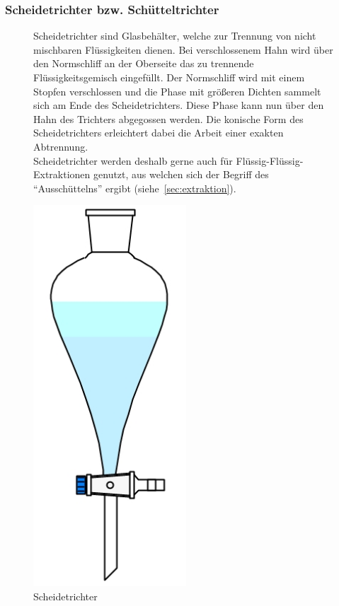  \newpage
 
\subsubsection*{Scheidetrichter bzw. Schütteltrichter}
\begin{figure}[h!]
	\begin{minipage}[t]{0.68\textwidth}
		\vspace{0pt}
		Scheidetrichter sind Glasbehälter, welche zur Trennung von nicht mischbaren Flüssigkeiten dienen. Bei verschlossenem Hahn wird über den Normschliff an der Oberseite das zu trennende Flüssigkeitsgemisch eingefüllt. Der Normschliff wird mit einem Stopfen verschlossen und die Phase mit größeren Dichten sammelt sich am Ende des Scheidetrichters. Diese Phase kann nun über den Hahn des Trichters abgegossen werden. Die konische Form des Scheidetrichters erleichtert dabei die Arbeit einer exakten Abtrennung.\\
		Scheidetrichter werden deshalb gerne auch für Flüssig-Flüssig-Extraktionen genutzt, aus welchen sich der Begriff des "`Ausschüttelns"' ergibt \mbox{(siehe \ref{sec:extraktion})}.
	\end{minipage}
	\hfill
	\begin{minipage}[t]{0.30\textwidth}
		\vspace{0pt}
		\centering
		\includegraphics[width=0.51\textwidth]{img/scheidetrichter}
		\caption{Scheidetrichter}
		\label{fig:scheidetrichter}
	\end{minipage}
\end{figure}
\FloatBarrier
\vspace{-7mm}
